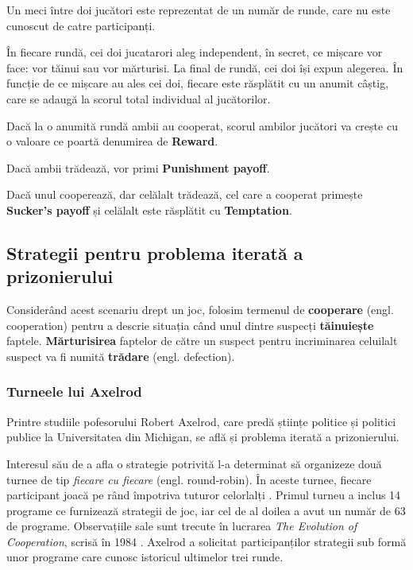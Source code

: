 Un meci între doi jucători este reprezentat de un număr de runde, care nu este cunoscut de catre participanți.

În fiecare rundă, cei doi jucatarori aleg independent, în secret, ce mișcare vor face: vor tăinui sau vor mărturisi. La final de rundă, cei doi își expun alegerea. În funcție de ce mișcare au ales cei doi, fiecare este răsplătit cu un anumit câștig, care se adaugă la scorul total individual al jucătorilor. 

Dacă la o anumită rundă ambii au cooperat, scorul ambilor jucători va crește cu o valoare ce poartă denumirea de \textbf{Reward}. 

Dacă ambii trădează, vor primi \textbf{Punishment payoff}. 

Dacă unul cooperează, dar celălalt trădează, cel care a cooperat primește \textbf{Sucker's payoff} și celălalt este răsplătit cu \textbf{Temptation}. 

\subsection {Strategii pentru problema iterată a prizonierului}

Considerând acest scenariu drept un joc, folosim termenul de \textbf{cooperare} (engl. cooperation) pentru a descrie situația când unul dintre suspecți \textbf{tăinuiește} faptele. \textbf{Mărturisirea} faptelor de către un suspect pentru incriminarea celuilalt suspect va fi numită \textbf{trădare} (engl. defection). 

\subsubsection{Turneele lui Axelrod}

Printre studiile pofesorului Robert Axelrod, care predă științe politice și politici publice la Universitatea din Michigan, se află și problema iterată a prizonierului.

Interesul său de a afla o strategie potrivită l-a determinat să organizeze două turnee de tip \textit{fiecare cu fiecare} (engl. round-robin). În aceste turnee, fiecare participant joacă pe rând împotriva tuturor celorlalți \cite{round_robin_dictionary}. Primul turneu a inclus 14 programe ce furnizează strategii de joc, iar cel de al doilea a avut un număr de 63 de programe. Observațiile sale sunt trecute în lucrarea \textit{The Evolution of Cooperation}, scrisă în 1984 \cite{article_by_melanie_mitchell}. Axelrod a solicitat participanților strategii sub formă unor programe care cunosc istoricul ultimelor trei runde.

